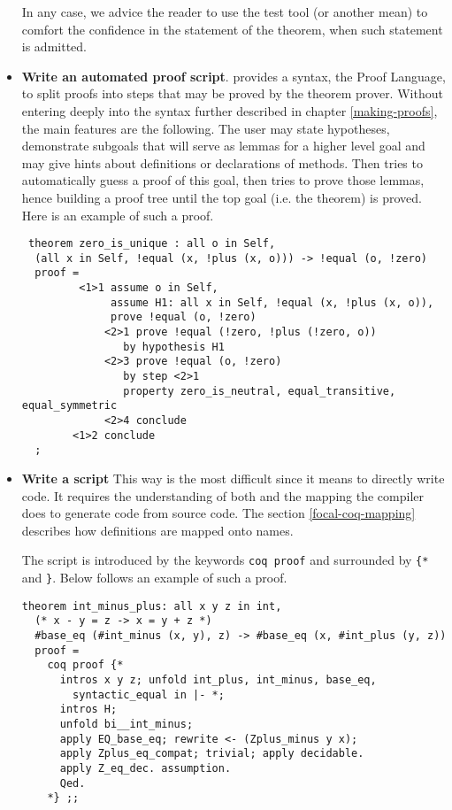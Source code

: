 \begin{itemize}
In any case,  we advice the reader to use
the test tool (or another mean) to comfort the confidence in the
statement of the theorem, when such statement is admitted.

\item {\bf Write an automated proof script}.  {\focal} provides a
  syntax, the {\focal} Proof Language, to split proofs into steps that
  may be proved by the {\zenon} theorem prover. Without entering deeply
  into the syntax further described in chapter \ref{making-proofs},
  the main features are the following. The user may state hypotheses,
  demonstrate subgoals that will serve as lemmas for a higher level
  goal and may give hints about definitions or declarations of
  methods. Then {\zenon} tries to automatically guess a proof of this
  goal, then tries to prove those lemmas, hence building a proof tree
  until the top goal (i.e. the theorem) is proved. Here is an
  example of such a proof.

 {\scriptsize
\begin{lstlisting}
 theorem zero_is_unique : all o in Self,
  (all x in Self, !equal (x, !plus (x, o))) -> !equal (o, !zero)
  proof =
         <1>1 assume o in Self,
              assume H1: all x in Self, !equal (x, !plus (x, o)),
              prove !equal (o, !zero)
             <2>1 prove !equal (!zero, !plus (!zero, o))
                by hypothesis H1
             <2>3 prove !equal (o, !zero)
                by step <2>1
                property zero_is_neutral, equal_transitive, equal_symmetric
             <2>4 conclude
        <1>2 conclude
  ;
\end{lstlisting}
}

  \item {\bf Write a {\coq} script} This way is the most difficult
     since it means to directly write {\coq} code. It
    requires the understanding of both {\coq} and the mapping the
    {\focal} compiler does to generate {\coq} code from {\focal} source
    code. The section \ref{focal-coq-mapping} describes %
     how {\focal} definitions are mapped onto
    {\coq} names.

The {\coq} script is introduced by the keywords {\tt coq proof} and
surrounded by {\tt \{*} and {\tt *\}}.
Below follows an example of such a proof.
{\scriptsize
\begin{lstlisting}
theorem int_minus_plus: all x y z in int,
  (* x - y = z -> x = y + z *)
  #base_eq (#int_minus (x, y), z) -> #base_eq (x, #int_plus (y, z))
  proof =
    coq proof {*
      intros x y z; unfold int_plus, int_minus, base_eq,
        syntactic_equal in |- *;
      intros H;
      unfold bi__int_minus;
      apply EQ_base_eq; rewrite <- (Zplus_minus y x);
      apply Zplus_eq_compat; trivial; apply decidable.
      apply Z_eq_dec. assumption.
      Qed.
    *} ;;
\end{lstlisting}
}
\end{itemize}



